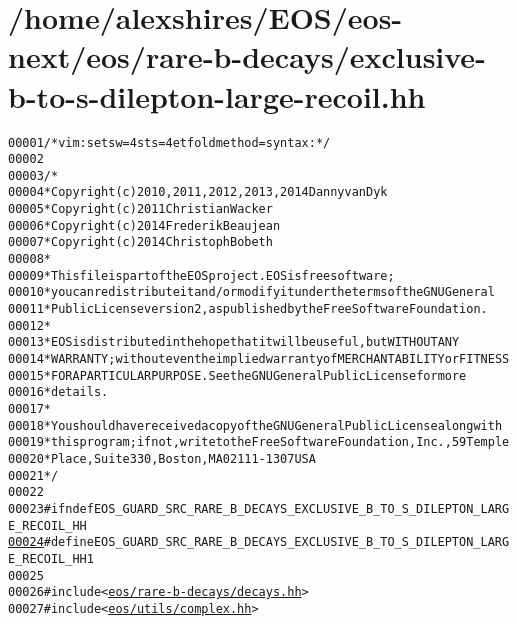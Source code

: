 \hypertarget{exclusive-b-to-s-dilepton-large-recoil_8hh_source}{
\section{/home/alexshires/EOS/eos-\/next/eos/rare-\/b-\/decays/exclusive-\/b-\/to-\/s-\/dilepton-\/large-\/recoil.hh}
}


\begin{footnotesize}\begin{alltt}
00001 \textcolor{comment}{/* vim: set sw=4 sts=4 et foldmethod=syntax : */}
00002 
00003 \textcolor{comment}{/*}
00004 \textcolor{comment}{ * Copyright (c) 2010, 2011, 2012, 2013, 2014 Danny van Dyk}
00005 \textcolor{comment}{ * Copyright (c) 2011 Christian Wacker}
00006 \textcolor{comment}{ * Copyright (c) 2014 Frederik Beaujean}
00007 \textcolor{comment}{ * Copyright (c) 2014 Christoph Bobeth}
00008 \textcolor{comment}{ *}
00009 \textcolor{comment}{ * This file is part of the EOS project. EOS is free software;}
00010 \textcolor{comment}{ * you can redistribute it and/or modify it under the terms of the GNU General}
00011 \textcolor{comment}{ * Public License version 2, as published by the Free Software Foundation.}
00012 \textcolor{comment}{ *}
00013 \textcolor{comment}{ * EOS is distributed in the hope that it will be useful, but WITHOUT ANY}
00014 \textcolor{comment}{ * WARRANTY; without even the implied warranty of MERCHANTABILITY or FITNESS}
00015 \textcolor{comment}{ * FOR A PARTICULAR PURPOSE.  See the GNU General Public License for more}
00016 \textcolor{comment}{ * details.}
00017 \textcolor{comment}{ *}
00018 \textcolor{comment}{ * You should have received a copy of the GNU General Public License along with}
00019 \textcolor{comment}{ * this program; if not, write to the Free Software Foundation, Inc., 59 Temple}
00020 \textcolor{comment}{ * Place, Suite 330, Boston, MA  02111-1307  USA}
00021 \textcolor{comment}{ */}
00022 
00023 \textcolor{preprocessor}{#ifndef EOS\_GUARD\_SRC\_RARE\_B\_DECAYS\_EXCLUSIVE\_B\_TO\_S\_DILEPTON\_LARGE\_RECOIL\_HH}
\hypertarget{exclusive-b-to-s-dilepton-large-recoil_8hh_source_l00024}{}\hyperlink{exclusive-b-to-s-dilepton-large-recoil_8hh_afae717ab235166a0482b75bcb9a1b3ea}{00024} \textcolor{preprocessor}{}\textcolor{preprocessor}{#define EOS\_GUARD\_SRC\_RARE\_B\_DECAYS\_EXCLUSIVE\_B\_TO\_S\_DILEPTON\_LARGE\_RECOIL\_HH 1}
00025 \textcolor{preprocessor}{}
00026 \textcolor{preprocessor}{#include <\hyperlink{decays_8hh}{eos/rare-b-decays/decays.hh}>}
00027 \textcolor{preprocessor}{#include <\hyperlink{complex_8hh}{eos/utils/complex.hh}>}

\end{alltt}
\end{footnotesize}
